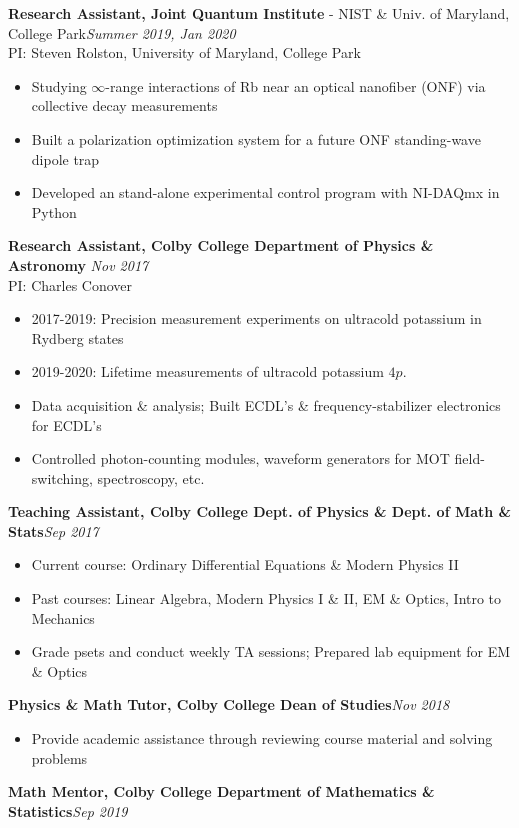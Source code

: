 \documentclass[letter, 11pt]{article}
\begin{document}
	\noindent \textbf{Research Assistant, Joint Quantum Institute} - NIST \& Univ. of Maryland, College Park\hfill \textit{Summer 2019, Jan 2020} \\ 
	\noindent PI: {Steven Rolston}, University of Maryland, College Park
	\begin{itemize}[noitemsep, nolistsep]
		\item Studying $\infty$-range interactions of Rb near an optical nanofiber (ONF) via collective decay measurements
		\item Built a polarization optimization system for a future ONF standing-wave dipole trap 
		\item Developed an stand-alone experimental control program with NI-DAQmx in Python
	\end{itemize}
	\textbf{Research Assistant, Colby College Department of Physics \& Astronomy}\hfill\textit{ Nov 2017\textemdash}\\
	PI: {Charles Conover}
	\begin{itemize}[noitemsep, nolistsep]
		\item 2017-2019: Precision measurement experiments on ultracold potassium in Rydberg states
		\item 2019-2020: Lifetime measurements of ultracold potassium $4p$. 
		\item Data acquisition \& analysis; Built ECDL's \& frequency-stabilizer electronics for ECDL's
		\item Controlled photon-counting modules, waveform generators for MOT field-switching, spectroscopy, etc.

	\end{itemize}	
 	\textbf{Teaching Assistant, Colby College Dept. of Physics \& Dept. of Math \& Stats}\hfill \textit{Sep  2017\textemdash}  
	\begin{itemize}[noitemsep, nolistsep]
		\item Current course: Ordinary Differential Equations \& Modern Physics II
		\item Past courses: Linear Algebra, Modern Physics I \& II, EM \& Optics, Intro to Mechanics
		\item Grade psets and conduct weekly TA sessions; Prepared lab equipment for EM \& Optics
	\end{itemize}
	\textbf{Physics \& Math Tutor, Colby College Dean of Studies}\hfill \textit{Nov 2018\textemdash }
	\begin{itemize}[noitemsep, nolistsep]
		\item Provide academic assistance through reviewing course material and solving problems
	\end{itemize}
	\textbf{Math Mentor, Colby College Department of Mathematics \& Statistics}\hfill \textit{Sep 2019\textemdash} \\	 
	
\end{document}
